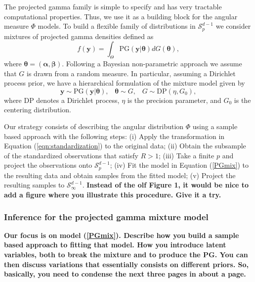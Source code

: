   The projected gamma family is simple to specify and has very tractable computational properties. Thus, we use it as a building block for the angular measure $\Phi$ models. To build a flexible family of distributions in $\mathcal{S}_p^{d-1}$ we consider mixtures of projected gamma densities defined as
  \begin{equation} \label{PGmix}     
     f(\bm{y}) = \int_\Theta \text{PG}(\bm{y}|\bm{\theta}) dG(\bm{\theta}), 
  \end{equation} 
  where $\bm{\theta} = (\bm{\alpha}, \bm{\beta})$. Following a Bayesian non-parametric approach \citep{Ferguson74,Antoniak1974} we assume that $G$ is drawn from a random measure. In particular, assuming a Dirichlet process prior, we have a hierarchical formulation of the mixture model given by
  \[    \bm{y} \sim \text{PG}(\bm{y}|\bm{\theta}) , \;\;\; \bm{\theta} \sim G, \;\;\; G \sim \text{DP}(\eta, G_0),\]
  where DP denotes a Dirichlet process, $\eta$ is the precision parameter, and $G_0$ is the centering distribution. 
  
  Our strategy consists of describing the angular distribution $\Phi$ using a sample based approach with the following steps: (i) Apply the transformation in Equation (\ref{eqn:standardization}) to the original data; (ii) Obtain the subsample of the standardized observations that satisfy $R>1$; (iii) Take a finite $p$ and project the observations onto $\mathcal{S}_p^{d-1}$; (iv) Fit the model in Equation (\ref{PGmix}) to the resulting data and obtain samples from the fitted model; (v) Project the resulting samples to $\mathcal{S}_\infty^{d-1}$. 
  {\bf Instead of the olf Figure 1, it would be nice to add a figure where you illustrate this procedure. Give it a try.}

\subsubsection{Inference for the projected gamma mixture model}
{\bf Our focus is on model (\ref{PGmix}). Describe how you build a sample based approach to fitting that model. How you introduce latent variables, both to break the mixture and to produce the PG. You can then discuss variations that essentially consists on different priors. So, basically, you need to condense the next three pages in about a page.}

